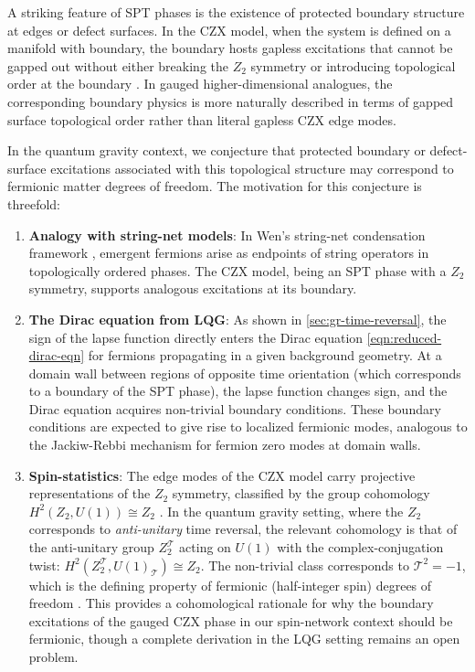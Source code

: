 \documentclass[preprint]{SciPost}
\newcommand{\mc}[1]{\mathcal{#1}}
\theoremstyle{plain} %
\begin{document}
A striking feature of SPT phases is the existence of protected boundary structure at edges or defect surfaces. In the CZX model, when the system is defined on a manifold with boundary, the boundary hosts gapless excitations that cannot be gapped out without either breaking the $ Z_2 $ symmetry or introducing topological order at the boundary \cite{Chen2011Symmetry,Chen2010Local}. In gauged higher-dimensional analogues, the corresponding boundary physics is more naturally described in terms of gapped surface topological order rather than literal gapless CZX edge modes.

In the quantum gravity context, we conjecture that protected boundary or defect-surface excitations associated with this topological structure may correspond to fermionic matter degrees of freedom. The motivation for this conjecture is threefold:

\begin{enumerate}
	\item \textbf{Analogy with string-net models}: In Wen's string-net condensation framework \cite{Wen2002aQuantum,Levin2004String-net}, emergent fermions arise as endpoints of string operators in topologically ordered phases. The CZX model, being an SPT phase with a $ Z_2 $ symmetry, supports analogous excitations at its boundary.

	\item \textbf{The Dirac equation from LQG}: As shown in \autoref{sec:gr-time-reversal}, the sign of the lapse function directly enters the Dirac equation \eqref{eqn:reduced-dirac-eqn} for fermions propagating in a given background geometry. At a domain wall between regions of opposite time orientation (which corresponds to a boundary of the SPT phase), the lapse function changes sign, and the Dirac equation acquires non-trivial boundary conditions. These boundary conditions are expected to give rise to localized fermionic modes, analogous to the Jackiw-Rebbi mechanism for fermion zero modes at domain walls.

	\item \textbf{Spin-statistics}: The edge modes of the CZX model carry projective representations of the $ Z_2 $ symmetry, classified by the group cohomology $ H^2(Z_2, U(1)) \cong Z_2 $ \cite{Chen2011Symmetry}. In the quantum gravity setting, where the $ Z_2 $ corresponds to \emph{anti-unitary} time reversal, the relevant cohomology is that of the anti-unitary group $ Z_2^{\mc{T}} $ acting on $ U(1) $ with the complex-conjugation twist: $ H^2(Z_2^{\mc{T}}, U(1)_{\mc{T}}) \cong Z_2 $. The non-trivial class corresponds to $ \mc{T}^2 = -1 $, which is the defining property of fermionic (half-integer spin) degrees of freedom \cite{Chen2011Symmetry,Kapustin2014Symmetry}. This provides a cohomological rationale for why the boundary excitations of the gauged CZX phase in our spin-network context should be fermionic, though a complete derivation in the LQG setting remains an open problem.
\end{enumerate}
\end{document}
